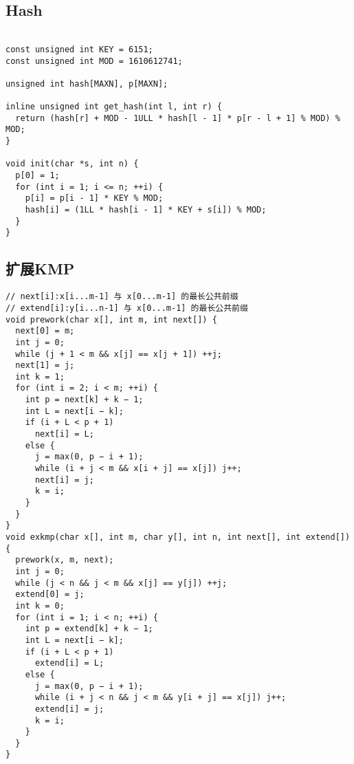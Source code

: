 \documentclass[twoside]{article}
\begin{document}
\subsection{Hash}
\begin{lstlisting}

const unsigned int KEY = 6151;
const unsigned int MOD = 1610612741;

unsigned int hash[MAXN], p[MAXN];

inline unsigned int get_hash(int l, int r) {
  return (hash[r] + MOD - 1ULL * hash[l - 1] * p[r - l + 1] % MOD) % MOD;
}

void init(char *s, int n) {
  p[0] = 1;
  for (int i = 1; i <= n; ++i) {
    p[i] = p[i - 1] * KEY % MOD;
    hash[i] = (1LL * hash[i - 1] * KEY + s[i]) % MOD;
  }
}

\end{lstlisting}
\subsection{扩展KMP}
\begin{lstlisting}
// next[i]:x[i...m-1] 与 x[0...m-1] 的最长公共前缀
// extend[i]:y[i...n-1] 与 x[0...m-1] 的最长公共前缀
void prework(char x[], int m, int next[]) {
  next[0] = m;
  int j = 0;
  while (j + 1 < m && x[j] == x[j + 1]) ++j;
  next[1] = j;
  int k = 1;
  for (int i = 2; i < m; ++i) {
    int p = next[k] + k − 1;
    int L = next[i − k];
    if (i + L < p + 1)
      next[i] = L;
    else {
      j = max(0, p − i + 1);
      while (i + j < m && x[i + j] == x[j]) j++;
      next[i] = j;
      k = i;
    }
  }
}
void exkmp(char x[], int m, char y[], int n, int next[], int extend[]) {
  prework(x, m, next);
  int j = 0;
  while (j < n && j < m && x[j] == y[j]) ++j;
  extend[0] = j;
  int k = 0;
  for (int i = 1; i < n; ++i) {
    int p = extend[k] + k − 1;
    int L = next[i − k];
    if (i + L < p + 1)
      extend[i] = L;
    else {
      j = max(0, p − i + 1);
      while (i + j < n && j < m && y[i + j] == x[j]) j++;
      extend[i] = j;
      k = i;
    }
  }
}

\end{lstlisting}
\end{document}
